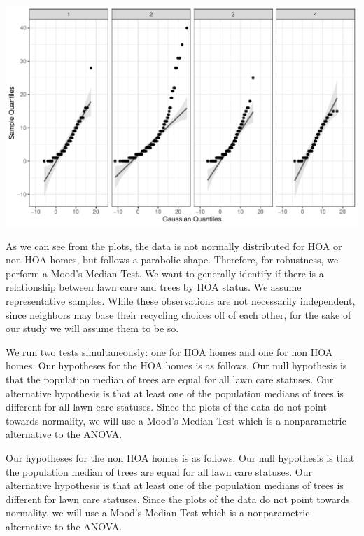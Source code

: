 \documentclass{article}
\begin{document}
\includegraphics{exam22-036}

As we can see from the plots\citep{qqplotr}, the data is not normally distributed for HOA or non HOA homes, but follows a parabolic shape. Therefore, for robustness, we perform a Mood's Median Test\citep{RVAideMemoire}. We want to generally identify if there is a relationship between lawn care and trees by HOA status. We assume representative samples. While these observations are not necessarily independent, since neighbors may base their recycling choices off of each other, for the sake of our study we will assume them to be so.

We run two tests simultaneously: one for HOA homes and one for non HOA homes.
Our hypotheses for the HOA homes is as follows. Our null hypothesis is that the population median of trees are equal for all lawn care statuses. Our alternative hypothesis is that at least one of the population medians of trees is different for all lawn care statuses. Since the plots of the data do not point towards normality, we will use a Mood's Median Test which is a nonparametric alternative to the ANOVA.

Our hypotheses for the non HOA homes is as follows. Our null hypothesis is that the population median of trees are equal for all lawn care statuses. Our alternative hypothesis is that at least one of the population medians of trees is different for lawn care statuses. Since the plots of the data do not point towards normality, we will use a Mood's Median Test which is a nonparametric alternative to the ANOVA.
\end{document}
